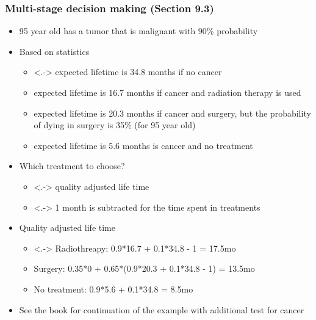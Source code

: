 \documentclass[10pt,handout]{beamer}
\begin{document}
\begin{frame}

\frametitle{Multi-stage decision making (Section 9.3)}

  \begin{itemize}
  \item<+-> 95 year old has a tumor that is malignant with 90\% probability
  \item<+-> Based on statistics
    \begin{itemize}
    \item<.-> expected lifetime is 34.8 months if no cancer
    \item<+-> expected lifetime is 16.7 months if cancer and radiation therapy is used
    \item<+-> expected lifetime is 20.3 months if cancer and surgery, but the probability of dying in surgery is 35\% (for 95 year old)
    \item<+-> expected lifetime is 5.6 months is cancer and no treatment
    \end{itemize}
  \item<+-> Which treatment to choose?
    \begin{itemize}
    \item<.-> quality adjusted life time
    \item<.-> 1 month is subtracted for the time spent in treatments
    \end{itemize}
   \item<+-> Quality adjusted life time
    \begin{itemize}
    \item<.-> Radiothreapy: 0.9*16.7 + 0.1*34.8 - 1 = 17.5mo
    \item<+-> Surgery: 0.35*0 + 0.65*(0.9*20.3 + 0.1*34.8 - 1) = 13.5mo
    \item<+-> No treatment: 0.9*5.6 + 0.1*34.8 = 8.5mo
    \end{itemize}
  \item<+-> See the book for continuation of the example with
    additional test for cancer
\end{itemize}

\end{frame}
\end{document}
